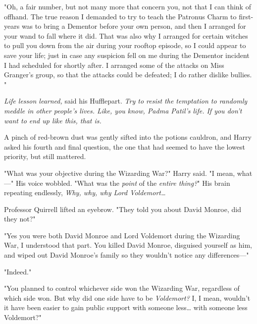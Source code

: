 "Oh, a fair number, but not many more that concern you, not that I can think of 
offhand. The true reason I demanded to try to teach the Patronus Charm to 
first-years was to bring a Dementor before your own person, and then I arranged 
for your wand to fall where it did.  That was also why I 
arranged for certain witches to pull you down from the air during your rooftop 
episode, so I could appear to save your life; just in case any suspicion fell 
on me during the Dementor incident I had scheduled for shortly after. 
 I arranged some of the attacks on Miss Granger's 
group, so that the attacks could be defeated; I do rather dislike bullies. 
"

\emph{Life lesson learned,} said his Hufflepart. \emph{Try to resist the 
temptation to randomly meddle in other people's lives. Like, you know, Padma 
Patil's life. If you don't want to end up like this, that is.}

A pinch of red-brown dust was gently sifted into the potions cauldron, and 
Harry asked his fourth and final question, the one that had seemed to have the 
lowest priority, but still mattered.

"What was your objective during the Wizarding War?" Harry said. "I mean, 
what---" His voice wobbled. "What was the\emph{ point} of the \emph{entire 
thing?}" His brain repeating endlessly, \emph{Why, why, why Lord 
Voldemort{\ldots}}

Professor Quirrell lifted an eyebrow. "They told you about David Monroe, did 
they not?"

"Yes you were both David Monroe and Lord Voldemort during the Wizarding War, I 
understood that part. You killed David Monroe, disguised yourself as him, and 
wiped out David Monroe's family so they wouldn't notice any differences---"

"Indeed."

"You planned to control whichever side won the Wizarding War, regardless of 
which side won. But why did one side have to be \emph{Voldemort?} I, I mean, 
wouldn't it have been easier to gain public support with someone less{\ldots} 
with someone less Voldemort?"

